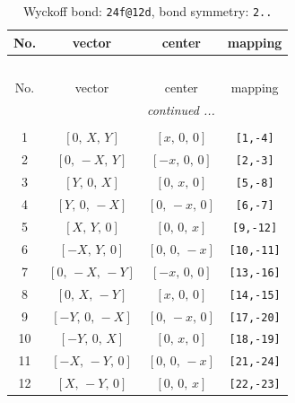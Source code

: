 \documentclass[fleqn,8pt]{jsarticle}
\begin{document}
\begin{longtable}{cccc}
\caption{Wyckoff bond: {\tt 24f@12d}, bond symmetry: {\tt 2..}}
 \\
 \hline \hline
No. & vector & center & mapping \\ \hline \endfirsthead

\multicolumn{3}{l}{\tablename\ \thetable{}} \\
 \hline \hline
No. & vector & center & mapping \\ \hline \endhead

 \hline \hline
\multicolumn{3}{r}{\footnotesize\it continued ...} \\ \endfoot

 \hline \hline
\multicolumn{3}{r}{} \\ \endlastfoot

1 & $\left[ 0,\, X,\, Y \right]$ & $\left[ x,\, 0,\, 0 \right]$ & {\tt [1,-4]} \\ \hline
2 & $\left[ 0,\, - X,\, Y \right]$ & $\left[ - x,\, 0,\, 0 \right]$ & {\tt [2,-3]} \\ \hline
3 & $\left[ Y,\, 0,\, X \right]$ & $\left[ 0,\, x,\, 0 \right]$ & {\tt [5,-8]} \\ \hline
4 & $\left[ Y,\, 0,\, - X \right]$ & $\left[ 0,\, - x,\, 0 \right]$ & {\tt [6,-7]} \\ \hline
5 & $\left[ X,\, Y,\, 0 \right]$ & $\left[ 0,\, 0,\, x \right]$ & {\tt [9,-12]} \\ \hline
6 & $\left[ - X,\, Y,\, 0 \right]$ & $\left[ 0,\, 0,\, - x \right]$ & {\tt [10,-11]} \\ \hline
7 & $\left[ 0,\, - X,\, - Y \right]$ & $\left[ - x,\, 0,\, 0 \right]$ & {\tt [13,-16]} \\ \hline
8 & $\left[ 0,\, X,\, - Y \right]$ & $\left[ x,\, 0,\, 0 \right]$ & {\tt [14,-15]} \\ \hline
9 & $\left[ - Y,\, 0,\, - X \right]$ & $\left[ 0,\, - x,\, 0 \right]$ & {\tt [17,-20]} \\ \hline
10 & $\left[ - Y,\, 0,\, X \right]$ & $\left[ 0,\, x,\, 0 \right]$ & {\tt [18,-19]} \\ \hline
11 & $\left[ - X,\, - Y,\, 0 \right]$ & $\left[ 0,\, 0,\, - x \right]$ & {\tt [21,-24]} \\ \hline
12 & $\left[ X,\, - Y,\, 0 \right]$ & $\left[ 0,\, 0,\, x \right]$ & {\tt [22,-23]} \\
\end{longtable}
\renewcommand{\arraystretch}{1.2}
\end{document}
